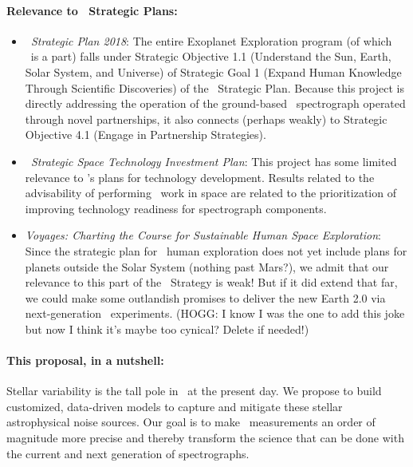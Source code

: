 \documentclass[12pt, letterpaper]{article}
\begin{document}
\paragraph{Relevance to \NASA\ Strategic Plans:}
\begin{itemize}
\item
\textit{\NASA\ Strategic Plan 2018}:
The entire Exoplanet Exploration program (of which \XRP\ is a part) falls under
Strategic Objective 1.1 (Understand the Sun, Earth, Solar System, and Universe)
of Strategic Goal 1 (Expand Human Knowledge Through Scientific Discoveries) of the
\NASA\ Strategic Plan.
Because this project is directly addressing the operation of the
ground-based \NNEXPLORE\ spectrograph operated through novel
partnerships, it also connects (perhaps weakly) to Strategic Objective
4.1 (Engage in Partnership Strategies).
\item
\textit{\NASA\ Strategic Space Technology Investment Plan}:
This project has some limited relevance to \NASA's plans for technology development.
Results related to the advisability of performing \EPRV\ work in space are related to
the prioritization of improving technology readiness for spectrograph components.
\item
\textit{Voyages: Charting the Course for Sustainable Human Space
  Exploration}: Since the strategic plan for \NASA\ human exploration
does not yet include plans for planets outside the Solar System
(nothing past Mars?), we admit that our relevance to this part of the
\NASA\ Strategy is weak! But if it did extend that far, we could make some 
outlandish promises to deliver the new Earth 2.0 via next-generation \EPRV\ 
experiments. 
(HOGG: I know I was the one to add this joke but now I think it's maybe too cynical? 
Delete if needed!)
\end{itemize}

\paragraph{This proposal, in a nutshell:}
Stellar variability is the tall pole in \EPRV\ at the present day.
We propose to build customized, data-driven models to capture and mitigate these
stellar astrophysical noise sources.
Our goal is to make \EPRV\ measurements an order of magnitude more precise
and thereby transform the science
that can be done with the current and next generation of spectrographs.

\end{document}

